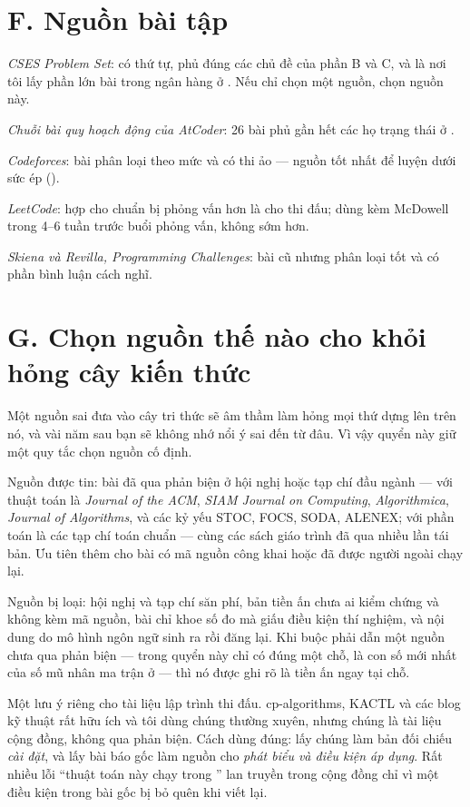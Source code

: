\documentclass[algorithm.tex]{subfiles}
\begin{document}
\section*{F. Nguồn bài tập}

\emph{CSES Problem Set}\cite{cses}: có thứ tự, phủ đúng các chủ đề của phần B và C, và là nơi tôi lấy phần lớn bài trong ngân hàng ở . Nếu chỉ chọn một nguồn, chọn nguồn này.

\emph{Chuỗi bài quy hoạch động của AtCoder}: 26 bài phủ gần hết các họ trạng thái ở .

\emph{Codeforces}: bài phân loại theo mức và có thi ảo --- nguồn tốt nhất để luyện dưới sức ép ().

\emph{LeetCode}: hợp cho chuẩn bị phỏng vấn hơn là cho thi đấu; dùng kèm McDowell\cite{mcdowell2015} trong 4--6 tuần trước buổi phỏng vấn, không sớm hơn.

\emph{Skiena và Revilla, \emph{Programming Challenges}}\cite{skiena2003}: bài cũ nhưng phân loại tốt và có phần bình luận cách nghĩ.

\section*{G. Chọn nguồn thế nào cho khỏi hỏng cây kiến thức}

Một nguồn sai đưa vào cây tri thức sẽ âm thầm làm hỏng mọi thứ dựng lên trên nó, và vài năm sau bạn sẽ không nhớ nổi ý sai đến từ đâu. Vì vậy quyển này giữ một quy tắc chọn nguồn cố định.

Nguồn được tin: bài đã qua phản biện ở hội nghị hoặc tạp chí đầu ngành --- với thuật toán là \emph{Journal of the ACM}, \emph{SIAM Journal on Computing}, \emph{Algorithmica}, \emph{Journal of Algorithms}, và các kỷ yếu STOC, FOCS, SODA, ALENEX; với phần toán là các tạp chí toán chuẩn --- cùng các sách giáo trình đã qua nhiều lần tái bản. Ưu tiên thêm cho bài có mã nguồn công khai hoặc đã được người ngoài chạy lại.

Nguồn bị loại: hội nghị và tạp chí săn phí, bản tiền ấn chưa ai kiểm chứng và không kèm mã nguồn, bài chỉ khoe số đo mà giấu điều kiện thí nghiệm, và nội dung do mô hình ngôn ngữ sinh ra rồi đăng lại. Khi buộc phải dẫn một nguồn chưa qua phản biện --- trong quyển này chỉ có đúng một chỗ, là con số mới nhất của số mũ nhân ma trận ở  --- thì nó được ghi rõ là tiền ấn ngay tại chỗ.

Một lưu ý riêng cho tài liệu lập trình thi đấu. cp-algorithms, KACTL và các blog kỹ thuật\cite{cpalgorithms,kactl} rất hữu ích và tôi dùng chúng thường xuyên, nhưng chúng là tài liệu cộng đồng, không qua phản biện. Cách dùng đúng: lấy chúng làm bản đối chiếu \emph{cài đặt}, và lấy bài báo gốc làm nguồn cho \emph{phát biểu và điều kiện áp dụng}. Rất nhiều lỗi ``thuật toán này chạy trong \Ob{\cdot}'' lan truyền trong cộng đồng chỉ vì một điều kiện trong bài gốc bị bỏ quên khi viết lại.
\end{document}
